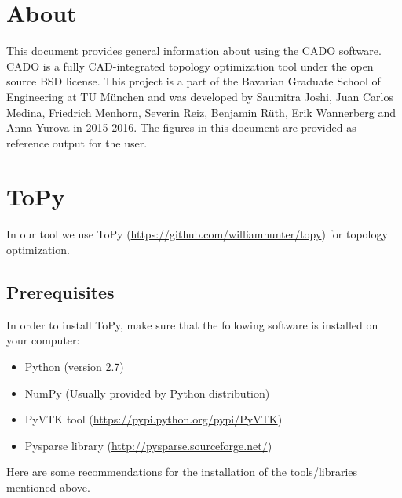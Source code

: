 \documentclass[
12pt, %
a4paper, %
oneside, %
headinclude,footinclude, %
BCOR5mm, %
]{scrartcl}
\begin{document}
\section*{About} %
This document provides general information about using the CADO software. CADO is a fully CAD-integrated topology optimization tool under the open source BSD license. This project is a part of the Bavarian Graduate School of Engineering at TU München and was developed by Saumitra Joshi, Juan Carlos Medina, Friedrich Menhorn, Severin Reiz, Benjamin R{\"u}th, Erik Wannerberg and Anna Yurova in 2015-2016. The figures in this document are provided as reference output for the user. 


\newpage %


\section{ToPy}
\label{Topy}
	In our tool we use ToPy (\href{https://github.com/williamhunter/topy}{https://github.com/williamhunter/topy}) for topology optimization. 
\subsection{Prerequisites}
\label{ToPy:sec1}
	In order to install ToPy, make sure that the following software is installed on your computer:
\begin{itemize}
	\item Python (version 2.7)
	\item NumPy (Usually provided by Python distribution)
	\item PyVTK tool (\href{https://pypi.python.org/pypi/PyVTK}{https://pypi.python.org/pypi/PyVTK}) 
	\item Pysparse library (\href{http://pysparse.sourceforge.net/}{http://pysparse.sourceforge.net/})
\end{itemize}
	Here are some recommendations for the installation of the tools/libraries mentioned above.
	
\end{document}
